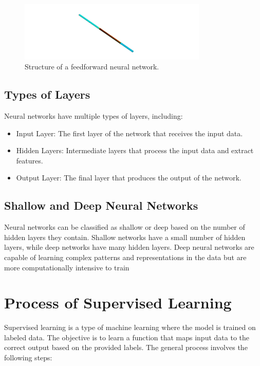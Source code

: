     \begin{figure}[h]
        \centering
        \includegraphics[width=0.8\textwidth]{00_Images/00_Velocity.png}
        \caption{Structure of a feedforward neural network.}
        \label{fig:neural_network}
    \end{figure}

    \subsection{Types of Layers}
        \noindent Neural networks have multiple types of layers, including:
            \begin{itemize}
                \item Input Layer: The first layer of the network that receives the input data.
                \item Hidden Layers: Intermediate layers that process the input data and extract features.
                \item Output Layer: The final layer that produces the output of the network.
            \end{itemize}
        \subsection{Shallow and Deep Neural Networks}
            \noindent Neural networks can be classified as shallow or deep based on the number of hidden layers they contain. Shallow networks have a small number of hidden layers, while deep networks have many hidden layers. Deep neural networks are capable of learning complex patterns and representations in the data but are more computationally intensive to train

\section{Process of Supervised Learning}
    Supervised learning is a type of machine learning where the model is trained on labeled data. The objective is to learn a function that maps input data to the correct output based on the provided labels. The general process involves the following steps:

